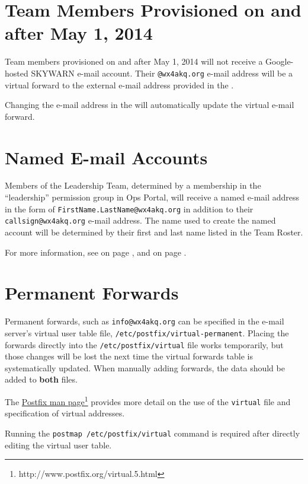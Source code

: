 \documentclass[pdflatex,letterpaper,twoside,12pt]{book}
\begin{document}
\section{Team Members Provisioned on and after May 1, 2014}

Team members provisioned on and after May 1, 2014 will not receive a Google-hosted SKYWARN e-mail account.  Their \texttt{@wx4akq.org} e-mail address will be a virtual forward to the external e-mail address provided in the .

Changing the e-mail address in the  will automatically update the virtual e-mail forward.

\section{Named E-mail Accounts}\label{named-email}

Members of the Leadership Team, determined by a membership in the ``leadership'' permission group in Ops Portal, will receive a named e-mail address in the form of \texttt{FirstName.LastName@wx4akq.org} in addition to their \texttt{callsign@wx4akq.org} e-mail address.  The name used to create the named account will be determined by their first and last name listed in the Team Roster.

For more information, see  on page \pageref{ops-manage-groups}, and  on page \pageref{team-roster}.

\section{Permanent Forwards}\label{perm-forwards}

Permanent forwards, such as \texttt{info@wx4akq.org} can be specified in the e-mail server's virtual user table file, \verb|/etc/postfix/virtual-permanent|.  Placing the forwards directly into the \verb|/etc/postfix/virtual| file works temporarily, but those changes will be lost the next time the virtual forwards table is systematically updated.  When manually adding forwards, the data should be added to \textbf{both} files.

The \href{http://www.postfix.org/virtual.5.html}{Postfix man page}\footnote{http://www.postfix.org/virtual.5.html} provides more detail on the use of the \texttt{virtual} file and specification of virtual addresses.

Running the \verb|postmap /etc/postfix/virtual| command is required after directly editing the virtual user table.
\end{document}
